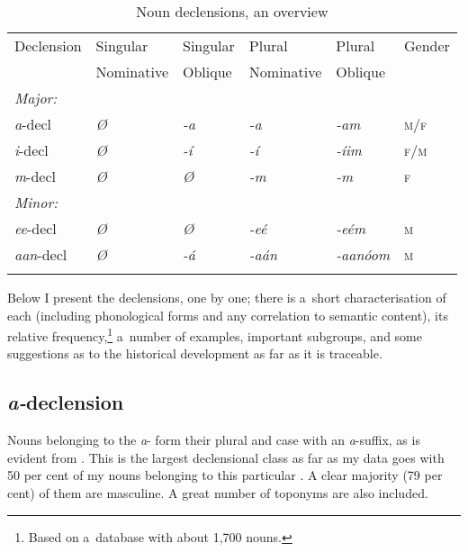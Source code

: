 \begin{table}[ht]
\caption{Noun declensions, an overview}
\begin{tabularx}{\textwidth}{ Q Q Q Q Q Q}
\lsptoprule
Declension &
Singular &
Singular &
Plural &
Plural &
Gender \\
&
Nominative &
Oblique &
Nominative &
Oblique
\\\midrule
\textit{Major:}\\
\textit{a}-decl &
\textit{Ø} &
\textit{-a} &
\textit{-a} &
\textit{-am} &
\textsc{m/f} \\
\textit{i}-decl &
\textit{Ø} &
\textit{-í} &
\textit{-í} &
\textit{-íim} &
\textsc{f/m} \\
\textit{m}-decl &
\textit{Ø} &
\textit{Ø} &
\textit{-m} &
\textit{-m} &
\textsc{f} \\
\textit{Minor:}\\
\textit{ee}-decl &
\textit{Ø} &
\textit{Ø} &
\textit{-eé} &
\textit{-eém} &
\textsc{m}\\
\textit{aan}-decl &
\textit{Ø} &
\textit{-á} &
\textit{-aán} &
\textit{-aanóom} &
\textsc{m} \\\lspbottomrule
\end{tabularx}
\label{tab:4-5b}
\end{table}

  
  Below I present the declensions, one by one;
  there is a~short characterisation of each (including phonological forms and any correlation to
  semantic content), its relative frequency,\footnote{Based on a~database with about 1,700 nouns.} a~number of examples, important subgroups, and some suggestions as to the historical development as far as it is traceable.


\subsection{\textit{a-}declension}
\label{subsec:4-6-1}


Nouns belonging to the \textit{a}- form their plural and  case with an \textit{a}-suffix, as is evident from . This is the largest declensional class as far as my data goes with 50 per cent of my nouns belonging to this particular . A clear majority (79 per cent) of them are masculine. A great number of toponyms are also included.


